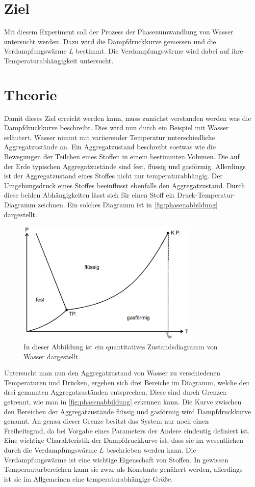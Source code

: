 \section{Ziel}
\label{sec:Ziel}
Mit diesem Experiment soll der Prozess der Phasenumwandlung von Wasser untersucht werden. Dazu wird die Dampfdruckkurve gemessen und die Verdampfungswärme $L$ bestimmt. Die Verdampfungswärme wird
dabei auf ihre Temperaturabhängigkeit untersucht.
\section{Theorie}
\label{sec:Theorie}
Damit dieses Ziel erreicht werden kann, muss zunächst verstanden werden was die Dampfdruckkurve beschreibt. Dies wird nun durch ein Beispiel mit Wasser erläutert.
Wasser nimmt mit variierender Temperatur unterschiedliche Aggregatzustände an. Ein Aggregatzustand beschreibt soetwas wie die Bewegungen der Teilchen eines Stoffen in einem bestimmten Volumen.
Die auf der Erde typischen Aggregatzustände sind fest, flüssig und gasförmig. Allerdings ist der Aggregatzustand eines Stoffes nicht nur temperaturabhängig. Der Umgebungsdruck eines Stoffes 
beeinflusst ebenfalls den Aggregatzustand. Durch diese beiden Abhängigkeiten lässt sich für einen Stoff ein Druck-Temperatur-Diagramm zeichnen. Ein solches Diagramm ist in \autoref{fig:phasenabbildung}
dargestellt.
\begin{figure}
    \centering
    \includegraphics[width=0.8\textwidth]{content/Phasenabbildung.PNG}
	\caption{In dieser Abbildung ist ein quantitatives Zustandsdiagramm von Wasser dargestellt. \cite{v203}}
	\label{fig:phasenabbildung}
\end{figure}
Untersucht man nun den Aggregatzustand von Wasser zu verschiedenen Temperaturen und Drücken, ergeben sich drei Bereiche im Diagramm, welche den drei genannten Aggregatzuständen entsprechen.  
Diese sind durch Grenzen
getrennt, wie man in \autoref{fig:phasenabbildung} erkennen kann. Die Kurve zwischen den Bereichen der Aggregatzustände flüssig und gasförmig wird Dampfdruckkurve genannt. An genau dieser Grenze besitzt das System
nur noch einen Freiheitsgrad, da bei Vorgabe eines Parameters der Andere eindeutig definiert ist. Eine wichtige Charakteristik der Dampfdruckkurve ist, dass sie im wesentlichen durch die 
Verdampfungswärme $L$ beschrieben werden kann. Die Verdampfungswärme ist eine wichtige Eigenschaft von Stoffen. In gewissen Temperauturbereichen kann sie zwar als Konstante genähert werden,
allerdings ist sie im Allgemeinen eine temperaturabhängige Größe. 

